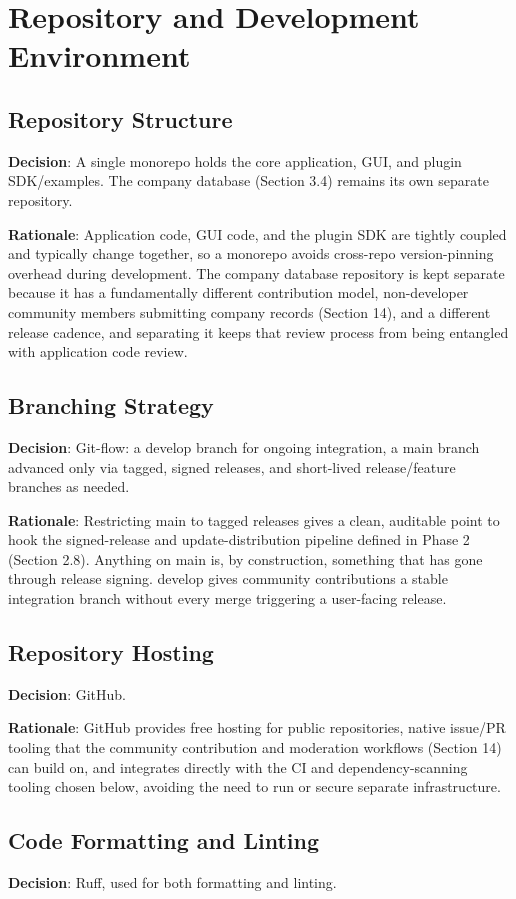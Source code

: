 \chapter{Repository and Development Environment}

\section{Repository Structure}
\textbf{Decision}:  A single monorepo holds the core application, GUI, and plugin SDK/examples. The company database (Section 3.4) remains its own separate repository.

\textbf{Rationale}:  Application code, GUI code, and the plugin SDK are tightly coupled and typically change together, so a monorepo avoids cross-repo version-pinning overhead during development. The company database repository is kept separate because it has a fundamentally different contribution model, non-developer community members submitting company records (Section 14), and a different release cadence, and separating it keeps that review process from being entangled with application code review.
\section{Branching Strategy}
\textbf{Decision}:  Git-flow: a develop branch for ongoing integration, a main branch advanced only via tagged, signed releases, and short-lived release/feature branches as needed.

\textbf{Rationale}:  Restricting main to tagged releases gives a clean, auditable point to hook the signed-release and update-distribution pipeline defined in Phase 2 (Section 2.8). Anything on main is, by construction, something that has gone through release signing. develop gives community contributions a stable integration branch without every merge triggering a user-facing release.
\section{Repository Hosting}
\textbf{Decision}:  GitHub.

\textbf{Rationale}:  GitHub provides free hosting for public repositories, native issue/PR tooling that the community contribution and moderation workflows (Section 14) can build on, and integrates directly with the CI and dependency-scanning tooling chosen below, avoiding the need to run or secure separate infrastructure.
\section{Code Formatting and Linting}
\textbf{Decision}:  Ruff, used for both formatting and linting.

